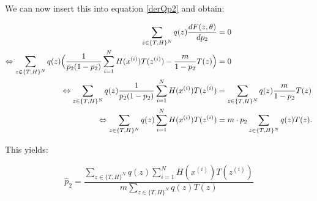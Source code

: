 \documentclass[10pt,a4paper]{article}
\begin{document}
We can now insert this into equation \ref{derQp2} and obtain:

\begin{align*}
\sum_{z\in \{T,H\}^N} q(z) \frac{dF(z,\theta)}{d p_2} &=0\\
\Leftrightarrow \sum_{z\in \{T,H\}^N} q(z)\Bigl ( \frac{1}{p_2(1-p_2)}\sum_{i=1}^N  H(x^{(i)})T(z^{(i)}) -  \frac{m}{1- p_2} T(z) \Bigr) &=0\\
\Leftrightarrow  \sum_{z\in \{T,H\}^N} q(z)\frac{1}{p_2(1-p_2)}\sum_{i=1}^N  H(x^{(i)})T(z^{(i)}) &=  \sum_{z\in \{T,H\}^N} q(z) \frac{m}{1- p_2} T(z)\\
\Leftrightarrow  \sum_{z\in \{T,H\}^N} q(z)\sum_{i=1}^N  H(x^{(i)})T(z^{(i)}) &=  m \cdot p_2\sum_{z\in \{T,H\}^N} q(z) T(z).
\end{align*}

This yields:

\begin{equation*}
\hat p_2 = \frac{\sum_{z\in \{T,H\}^N} q(z)\sum_{i=1}^N  H(x^{(i)})T(z^{(i)})}{m \sum_{z\in \{T,H\}^N} q(z) T(z)}
\end{equation*}

\end{document}
